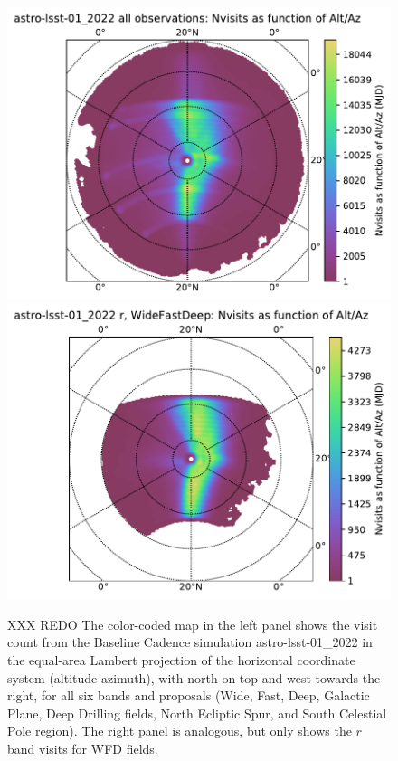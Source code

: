 \documentclass[DM,lsstdraft,authoryear,toc]{lsstdoc}
\begin{document}
\begin{figure}[t!]
\vskip -0.0in
\includegraphics[angle=0,width=0.49\hsize,clip]{figures/astro-lsst-01_2022_Nvisits_as_function_of_Alt_Az_all_observations_HEAL_SkyMap.pdf}
\includegraphics[angle=0,width=0.49\hsize,clip]{figures/astro-lsst-01_2022_Nvisits_as_function_of_Alt_Az_r_WideFastDeep_HEAL_SkyMap.pdf}
\vskip -0.1in
\caption{XXX REDO The color-coded map in the left panel shows the visit count from the
Baseline Cadence simulation astro-lsst-01\_2022 in the equal-area Lambert projection of the
horizontal coordinate system (altitude-azimuth), with north on top and west towards the
right, for all six bands and proposals (Wide, Fast, Deep, Galactic Plane, Deep Drilling
fields, North Ecliptic Spur, and South Celestial Pole region). The right panel is analogous,
but only shows the $r$ band visits for WFD fields.}
\label{fig:baseline_AltAz}
\end{figure}
\end{document}
